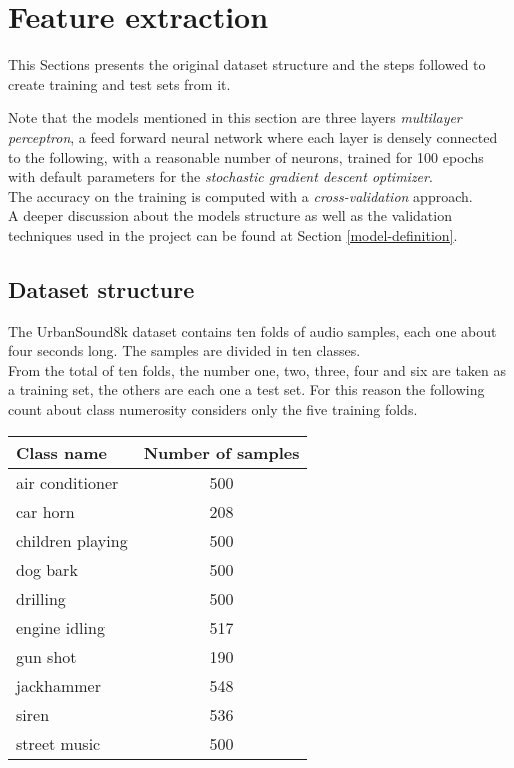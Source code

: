 \section{Feature extraction}
\label{feature-extraction}

This Sections presents the original dataset structure and the 
steps followed to create training and test sets from it.

Note that the models mentioned in this section are
three layers \emph{multilayer perceptron}, 
a feed forward neural network where each layer 
is densely connected  to the following, 
with a reasonable number of neurons, trained 
for 100 epochs with default parameters for the \emph{stochastic gradient 
descent optimizer}.~\cite{mlp}\cite{sgd}\\
The accuracy on the training is computed with a \emph{cross-validation} 
approach.~\cite{cross}\\
A deeper discussion about the models structure as well as the validation
techniques used in the project can be found at Section \vref{model-definition}.

\subsection{Dataset structure}
\label{dataset-structure}

The UrbanSound8k dataset contains ten folds of audio samples, each one about 
four seconds long. The samples are divided in ten classes.\\
From the total of ten folds, the number one, two, three, four and six 
are taken as a training set, the others are each one a test set.
For this reason the following count about class numerosity considers
only the five training folds.

\begin{center}
    \begin{tabular}{ |l|c| } 
        \hline
        Class name & Number of samples \\
        \hline
        air conditioner & 500 \\
        car horn & 208 \\
        children playing & 500 \\
        dog bark & 500 \\
        drilling & 500 \\
        engine idling & 517 \\
        gun shot & 190 \\
        jackhammer & 548 \\
        siren & 536 \\
        street music & 500 \\
        \hline
    \end{tabular}
\end{center}

